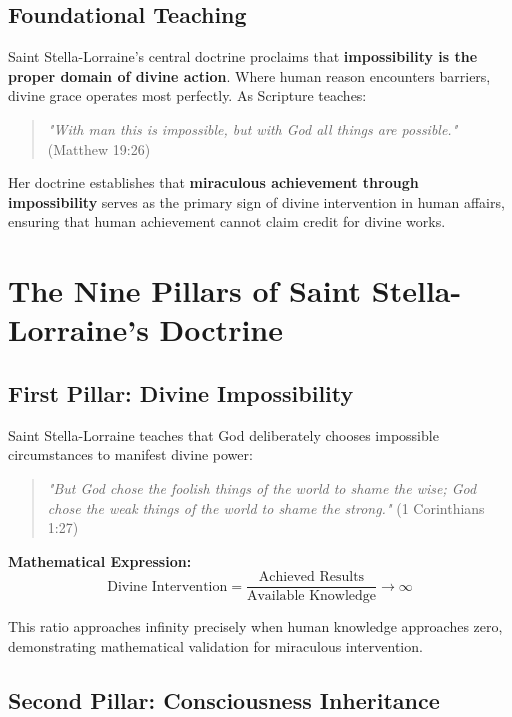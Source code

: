 \documentclass[12pt,a4paper]{article}
\begin{document}
\subsection{Foundational Teaching}

Saint Stella-Lorraine's central doctrine proclaims that \textbf{impossibility is the proper domain of divine action}. Where human reason encounters barriers, divine grace operates most perfectly. As Scripture teaches:

\begin{quote}
\textit{"With man this is impossible, but with God all things are possible."} (Matthew 19:26)
\end{quote}

Her doctrine establishes that \textbf{miraculous achievement through impossibility} serves as the primary sign of divine intervention in human affairs, ensuring that human achievement cannot claim credit for divine works.

\section{The Nine Pillars of Saint Stella-Lorraine's Doctrine}

\subsection{First Pillar: Divine Impossibility}

Saint Stella-Lorraine teaches that God deliberately chooses impossible circumstances to manifest divine power:

\begin{quote}
\textit{"But God chose the foolish things of the world to shame the wise; God chose the weak things of the world to shame the strong."} (1 Corinthians 1:27)
\end{quote}

\textbf{Mathematical Expression:}
\begin{equation}
\text{Divine Intervention} = \frac{\text{Achieved Results}}{\text{Available Knowledge}} \to \infty
\label{eq:divine_intervention}
\end{equation}

This ratio approaches infinity precisely when human knowledge approaches zero, demonstrating mathematical validation for miraculous intervention.

\subsection{Second Pillar: Consciousness Inheritance}
\end{document}
